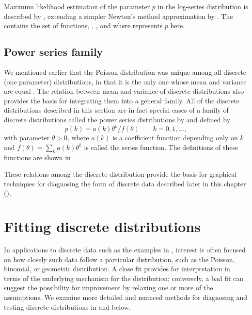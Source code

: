 \documentclass[11pt]{book}\usepackage[]{graphicx}\usepackage[]{color}
\begin{document}
Maximum likelihood estimation of the parameter $p$ in the log-series
distribution is described by \citet{Bohning:1983}, extending a simpler
Newton's method approximation by \citet{Birch:63}.
The  contains the
set of \R functions, 
,
,
 and
 where  represents $p$ here.





\subsection{Power series family}\label{sec:pwrseries}

We mentioned earlier that the Poisson distribution was unique among all discrete (one parameter) distributions, in that it is the only one whose mean and variance are equal
\citep{Kosambi:49}.
The relation between mean and variance of discrete distributions also provides
the basis for integrating them into a general family.
All of the discrete distributions described in this section are in fact
special cases of a family of discrete distributions
called the power series distributions by
\citet{Noack:50}
and defined by
\begin{equation*}
p(k) = a(k) \theta^k / f(\theta)
\quad\quad k=0, 1, \dots \comma
\end{equation*}
with parameter $\theta > 0$,
where $a(k)$ is a coefficient function depending only on $k$
and $f ( \theta) = \sum_k a(k) \theta^k$ is called the series
function.  The definitions of these functions are shown in
.


These relations among the discrete distribution provide the basis for
graphical techniques for diagnosing the form of discrete data described
later in this chapter ().


\section{Fitting discrete distributions}\label{sec:discrete-fit}

In applications to discrete data such as the examples in
, interest is often focused on how closely such data follow a
particular distribution, such as the Poisson, binomial, or geometric
distribution.  A close fit provides for interpretation in terms
of the underlying mechanism for the distribution;  conversely, a
bad fit can suggest the possibility for improvement by relaxing
one or more of the assumptions. We examine more detailed and
nuanced methods for diagnosing and testing discrete distributions
in  and 
below.
\end{document}
